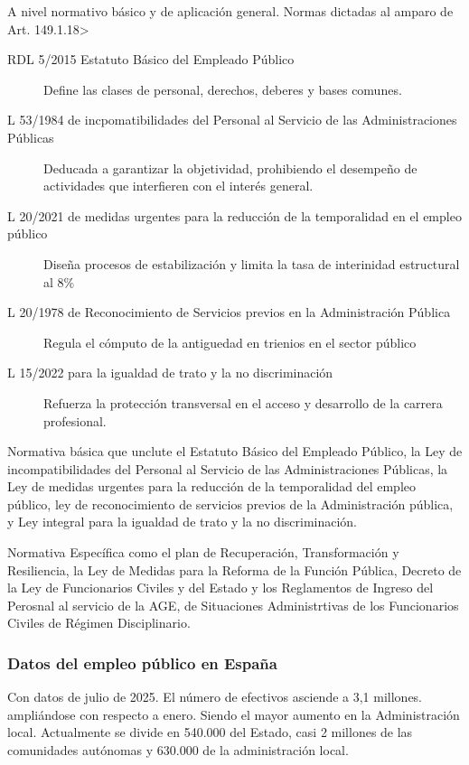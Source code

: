         A nivel normativo básico y de aplicación general. Normas dictadas al amparo de Art. 149.1.18>
        \begin{description}
            \item[RDL 5/2015 Estatuto Básico del Empleado Público] Define las clases de personal, derechos, deberes y bases comunes.
            \item[L 53/1984 de incpomatibilidades del Personal al Servicio de las Administraciones Públicas] Deducada a garantizar la objetividad, prohibiendo el desempeño de actividades que interfieren con el interés general.
            \item[L 20/2021 de medidas urgentes para la reducción de la temporalidad en el empleo público]  Diseña procesos de estabilización y limita la tasa de interinidad estructural al 8\%
            \item[L 20/1978 de Reconocimiento de Servicios previos en la Administración Pública] Regula el cómputo de la antiguedad en trienios en el sector público
            \item[L 15/2022 para la igualdad de trato y la no discriminación] Refuerza la protección transversal en el acceso y desarrollo de la carrera profesional.
        \end{description}

        Normativa básica que unclute el Estatuto Básico del Empleado Público, la Ley de incompatibilidades del Personal al Servicio de las Administraciones Públicas, la Ley de medidas urgentes para la reducción de la temporalidad del empleo público, ley de reconocimiento de servicios previos de la Administración pública, y Ley integral para la igualdad de trato y la no discriminación.

        Normativa Específica como el plan de Recuperación, Transformación y Resiliencia, la Ley de Medidas para la Reforma de la Función Pública, Decreto de la Ley de Funcionarios Civiles y del Estado y los Reglamentos de Ingreso del Perosnal al servicio de la AGE, de Situaciones Administrtivas de los Funcionarios Civiles
        de Régimen Disciplinario.

    \subsubsection{Datos del empleo público en España} %
        Con datos de julio de 2025. El número de efectivos asciende a 3,1 millones. ampliándose con respecto a enero. Siendo el mayor aumento en la Administración local. Actualmente se divide en 540.000 del Estado, casi 2 millones de las comunidades autónomas y 630.000 de la administración local.

